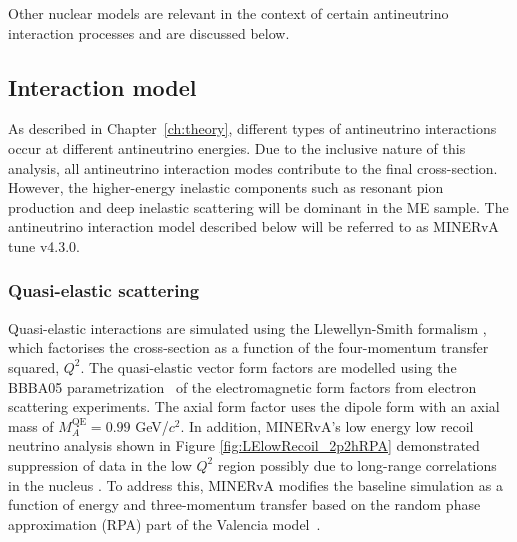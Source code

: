 Other nuclear models are relevant in the context of certain antineutrino interaction processes and are discussed below.



\subsection{Interaction model}
As described in Chapter~\ref{ch:theory}, different types of antineutrino interactions occur at different antineutrino energies. Due to the inclusive nature of this analysis, all antineutrino interaction modes contribute to the final cross-section. However, the higher-energy inelastic components such as resonant pion production and deep inelastic scattering will be dominant in the ME sample. The antineutrino interaction model described below will be referred to as MINERvA tune v4.3.0.


\subsubsection{Quasi-elastic scattering}
Quasi-elastic interactions are simulated using the Llewellyn-Smith formalism \cite{LLEWELLYNSMITH1972261}, which factorises the cross-section as a function of the four-momentum transfer squared, $Q^2$. The quasi-elastic vector form factors are modelled using the BBBA05 parametrization~\cite{BRADFORD2006127} of the electromagnetic form factors from electron scattering experiments. The axial form factor uses the dipole form with an axial mass of $M_{A}^{\text{QE}} = 0.99$ GeV/$c^2$. In addition, MINERvA's low energy low recoil neutrino analysis shown in Figure \ref{fig:LElowRecoil_2p2hRPA} demonstrated suppression of data in the low $Q^2$ region possibly due to long-range correlations in the nucleus \cite{Rodrigues2016_PhysRevLett.116.071802}. To address this, MINERvA modifies the baseline simulation as a function of energy and three-momentum transfer based on the random phase approximation (RPA) part of the Valencia model~\cite{RPANieves2004_PhysRevC.70.055503, gran2017model}.

